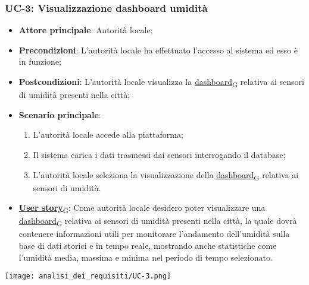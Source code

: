 \subsubsection{UC-3: Visualizzazione dashboard umidità}
\begin{itemize}
	\item \textbf{Attore principale}: Autorità locale;
	\item \textbf{Precondizioni}: L'autorità locale ha effettuato l'accesso al sistema ed esso è in funzione;
	\item \textbf{Postcondizioni}: L'autorità locale visualizza la \href{https://7last.github.io/docs/rtb/documentazione-interna/glossario\#dashboard}{dashboard\textsubscript{G}} relativa
	      ai sensori di umidità presenti nella città;
	\item \textbf{Scenario principale}:
	      \begin{enumerate}
		      \item L'autorità locale accede alla piattaforma;
		      \item Il sistema carica i dati trasmessi dai sensori interrogando il database;
		      \item L'autorità locale seleziona la visualizzazione della \href{https://7last.github.io/docs/rtb/documentazione-interna/glossario\#dashboard}{dashboard\textsubscript{G}} relativa ai sensori di umidità.
	      \end{enumerate}
	\item \href{https://7last.github.io/docs/rtb/documentazione-interna/glossario\#user-story}{\textbf{User story}\textsubscript{G}}:
	      Come autorità locale desidero poter visualizzare una \href{https://7last.github.io/docs/rtb/documentazione-interna/glossario\#dashboard}{dashboard\textsubscript{G}} relativa ai sensori di umidità presenti nella città, la quale
	      dovrà contenere informazioni utili per monitorare l'andamento dell'umidità sulla base di dati storici e in tempo reale, mostrando
	      anche statistiche come l'umidità media, massima e minima nel periodo di tempo selezionato.
\end{itemize}
\begin{center}
	\texttt{[image: analisi\_dei\_requisiti/UC-3.png]}
\end{center}

